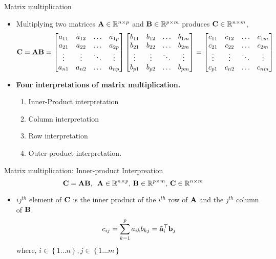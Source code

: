 \documentclass[aspectratio=169]{beamer}
\let\olditem\item
\renewcommand{\item}{\setlength{\itemsep}{\fill}\olditem}
\def\mf{\ensuremath\mathbf}
\begin{document}
\begin{frame}[t]{Matrix multiplication}
\begin{itemize}
\item Multiplying two matrices $\mf{A} \in \mathbb{R}^{n \times p}$ and $\mf{B} \in \mathbb{R}^{p \times m}$ produces $\mf{C} \in \mathbb{R}^{n \times m}$,
\[ \mf{C} = \mf{A}\mf{B} = \begin{bmatrix}
a_{11} & a_{12} & \ldots & a_{1p} \\
a_{21} & a_{22} & \ldots & a_{2p} \\
\vdots & \vdots & \ddots & \vdots \\
a_{n1} & a_{n2} & \ldots & a_{np} \\
\end{bmatrix} \begin{bmatrix}
b_{11} & b_{12} & \ldots & b_{1m} \\
b_{21} & b_{22} & \ldots & b_{2m} \\
\vdots & \vdots & \ddots & \vdots \\
b_{p1} & b_{p2} & \ldots & b_{pm} \\
\end{bmatrix} = \begin{bmatrix}
c_{11} & c_{12} & \ldots & c_{1m} \\
c_{21} & c_{22} & \ldots & c_{2m} \\
\vdots & \vdots & \ddots & \vdots \\
c_{p1} & c_{n2} & \ldots & c_{nm} \\
\end{bmatrix}\]

\item \textbf{Four interpretations of matrix multiplication.}
\begin{enumerate}
  \item Inner-Product interpretation
  \item Column interpretation
  \item Row interpretation
  \item Outer product interpretation.
\end{enumerate} 
\end{itemize}
\end{frame}

\begin{frame}[t]{Matrix multiplication: Inner-product Interpreation}
\[ \mf{C} = \mf{A}\mf{B}, \,\,\, \mf{A} \in \mathbb{R}^{n \times p}, \, \mf{B} \in \mathbb{R}^{p \times m}, \, \mf{C} \in \mathbb{R}^{n \times m} \]
\begin{itemize}
\item $ij^{th}$ element of $\mf{C}$ is the inner product of the $i^{th}$ row of $\mf{A}$ and the $j^{th}$ column of $\mf{B}$.
 \[ c_{ij} = \sum_{k=1}^{p} a_{ik} b_{kj} = \tilde{\mf{a}}_i^{\top}\mf{b}_j \]
 where, $i \in \left\{1 \ldots n\right\}, j \in \left\{1 \ldots m\right\}$
\end{itemize}
\end{frame}
\end{document}
